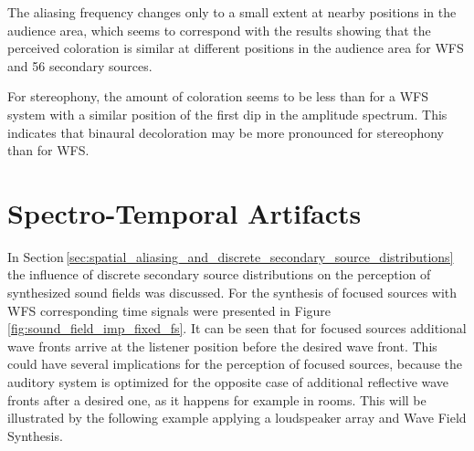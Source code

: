 The aliasing frequency changes only to a small extent at nearby positions in the
audience area, which seems to correspond with the results showing that the perceived
coloration is similar at different positions in the audience area for \ac{WFS}
and 56 secondary sources.

For stereophony, the amount of coloration seems to be less than for a \ac{WFS}
system with a similar position of the first dip in the amplitude spectrum. This
indicates that binaural decoloration may be more pronounced for stereophony than
for \ac{WFS}.

\section{Spectro-Temporal Artifacts}
\label{sec:spectro_temporal_artifacts}

In Section\,\ref{sec:spatial_aliasing_and_discrete_secondary_source_distributions}
the influence of discrete secondary source distributions on the perception of
synthesized sound fields was discussed. For the synthesis of focused sources
with \ac{WFS} corresponding time signals were presented in
Figure\,\ref{fig:sound_field_imp_fixed_fs}. It can be seen that for focused
sources additional wave fronts arrive at the listener position before the
desired wave front. This could have several implications for the perception of
focused sources, because the auditory system is optimized for the opposite case of
additional reflective wave fronts after a desired one, as it happens for example
in rooms.
This will be illustrated by the following example applying
a loudspeaker array and Wave Field Synthesis.

